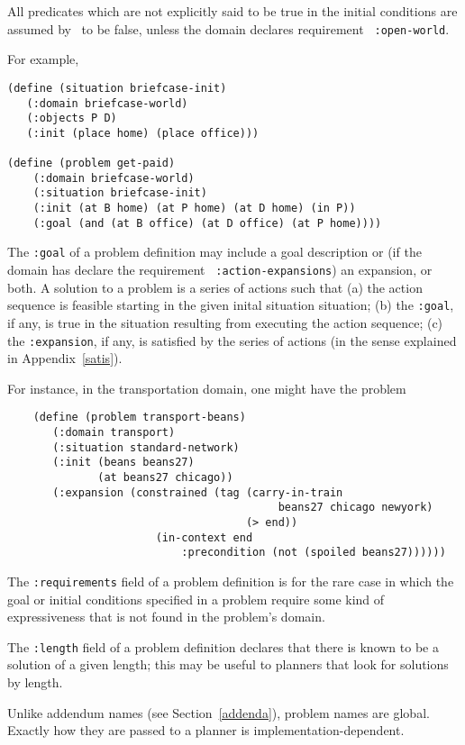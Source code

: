 All predicates which are
not explicitly said to be true in the initial conditions are assumed by
\lang\ to be false, unless the domain declares requirement {\tt
:open-world}.  

For example, 

\begin{verbatim}
(define (situation briefcase-init)
   (:domain briefcase-world)
   (:objects P D)
   (:init (place home) (place office)))

(define (problem get-paid)       
    (:domain briefcase-world)
    (:situation briefcase-init)
    (:init (at B home) (at P home) (at D home) (in P))
    (:goal (and (at B office) (at D office) (at P home))))
\end{verbatim}

The {\tt :goal} of a problem definition may include a goal description
or (if the domain has declare the requirement {\tt
:action-expansions}) an expansion, or both.  A solution to a problem
is a series of actions such that (a) the action sequence is feasible
starting in the given inital situation situation; (b) 
the {\tt :goal}, if any, is true in the situation resulting from
executing the action sequence; (c) the {\tt :expansion}, if any, is
satisfied by the series of actions  (in
the sense explained in Appendix~\ref{satis}).

For
instance, in the transportation domain, one might have the problem
\begin{verbatim}
    (define (problem transport-beans)
       (:domain transport)
       (:situation standard-network)
       (:init (beans beans27)
              (at beans27 chicago))
       (:expansion (constrained (tag (carry-in-train 
                                          beans27 chicago newyork)
                                     (> end))
                       (in-context end
                           :precondition (not (spoiled beans27))))))
\end{verbatim}

The {\tt :requirements} field of a problem definition is for the rare
case in which the goal or initial conditions specified in a problem
require some kind of expressiveness that is not found in the problem's
domain.  

The {\tt :length} field of a problem definition declares that there is
known to be a  solution of a given length; this may be useful to
planners that look for solutions by length.

Unlike addendum names (see Section~\ref{addenda}), problem names are
global.  Exactly how they are passed to a planner is
implementation-dependent.

